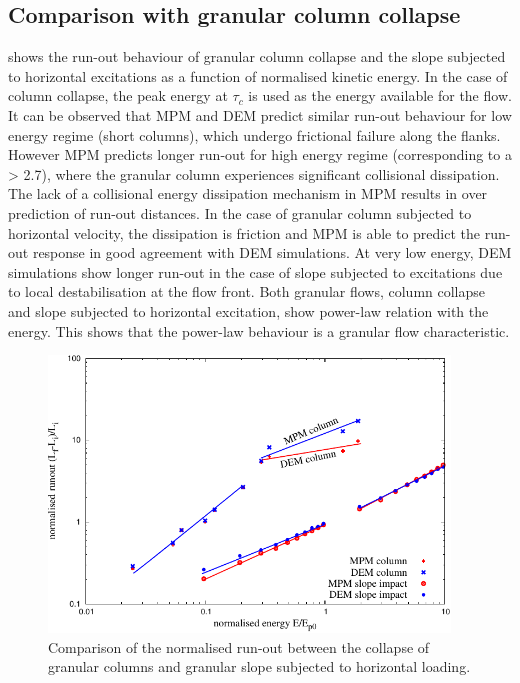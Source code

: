 \subsection{Comparison with granular column collapse}

 shows the run-out behaviour of granular column 
collapse and the slope subjected to horizontal excitations as a function of 
normalised kinetic energy. In the case of column collapse, the peak energy at 
$\tau_c$ is used as the energy available for the flow. It can be observed that 
MPM and DEM predict similar run-out behaviour for low energy regime (short 
columns), which undergo frictional failure along the flanks. However MPM 
predicts longer run-out for high energy regime (corresponding to a > 2.7), 
where the granular column experiences significant collisional dissipation. The 
lack of a collisional energy dissipation mechanism in MPM results in over 
prediction of run-out distances. In the case of granular column subjected to 
horizontal velocity, the dissipation is friction and MPM is able to predict the 
run-out response in good agreement with DEM simulations. At very low energy, 
DEM simulations show longer run-out in the case of slope subjected to 
excitations due to local destabilisation at the flow front. Both granular 
flows, column collapse and slope subjected to horizontal excitation, show 
power-law relation with the 
energy. This shows that the power-law behaviour is a granular flow 
characteristic.

\begin{figure}[tbhp]
\centering
\includegraphics[width=0.95\textwidth]{Runout_Slope_Column}
\caption{Comparison of the normalised run-out between the collapse of granular 
columns and granular slope subjected to horizontal loading.}
\label{fig:Runout_Slope_Column}
\end{figure}

